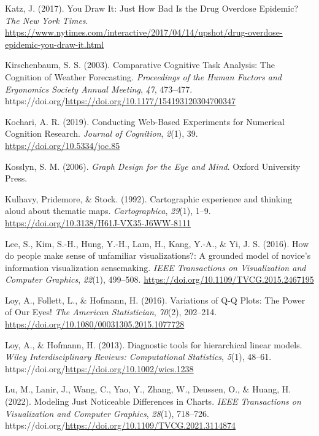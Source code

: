 \documentclass[
  10pt,
]{article}
\newlength{\cslhangindent}
\newenvironment{CSLReferences}[2] %
 {\begin{list}{}{%
  \setlength{\itemindent}{0pt}
  \setlength{\leftmargin}{0pt}
  \setlength{\parsep}{0pt}
  \ifodd #1
   \setlength{\leftmargin}{\cslhangindent}
   \setlength{\itemindent}{-1\cslhangindent}
  \fi
  \setlength{\itemsep}{#2\baselineskip}}}
 {\end{list}}
\begin{document}
\begin{CSLReferences}{1}{0}
Katz, J. (2017). You {Draw} {It}: {Just} {How} {Bad} {Is} the {Drug}
{Overdose} {Epidemic}? \emph{The New York Times}.
\url{https://www.nytimes.com/interactive/2017/04/14/upshot/drug-overdose-epidemic-you-draw-it.html}

Kirschenbaum, S. S. (2003). Comparative {Cognitive} {Task} {Analysis}:
{The} {Cognition} of {Weather} {Forecasting}. \emph{Proceedings of the
{Human} {Factors} and {Ergonomics} {Society} {Annual} {Meeting}},
\emph{47}, 473--477.
https://doi.org/\url{https://doi.org/10.1177/154193120304700347}

Kochari, A. R. (2019). Conducting {Web-Based Experiments} for {Numerical
Cognition Research}. \emph{Journal of Cognition}, \emph{2}(1), 39.
\url{https://doi.org/10.5334/joc.85}

Kosslyn, S. M. (2006). \emph{Graph {Design} for the {Eye} and {Mind}}.
Oxford University Press.

Kulhavy, Pridemore, \& Stock. (1992). Cartographic experience and
thinking aloud about thematic maps. \emph{Cartographica}, \emph{29}(1),
1--9. \url{https://doi.org/10.3138/H61J-VX35-J6WW-8111}

Lee, S., Kim, S.-H., Hung, Y.-H., Lam, H., Kang, Y.-A., \& Yi, J. S.
(2016). How do people make sense of unfamiliar visualizations?: A
grounded model of novice's information visualization sensemaking.
\emph{{IEEE} Transactions on Visualization and Computer Graphics},
\emph{22}(1), 499--508. \url{https://doi.org/10.1109/TVCG.2015.2467195}

Loy, A., Follett, L., \& Hofmann, H. (2016). Variations of {Q-Q Plots}:
{The Power} of {Our Eyes}! \emph{The American Statistician},
\emph{70}(2), 202--214.
\url{https://doi.org/10.1080/00031305.2015.1077728}

Loy, A., \& Hofmann, H. (2013). Diagnostic tools for hierarchical linear
models. \emph{Wiley Interdisciplinary Reviews: Computational
Statistics}, \emph{5}(1), 48--61.
https://doi.org/\url{https://doi.org/10.1002/wics.1238}

Lu, M., Lanir, J., Wang, C., Yao, Y., Zhang, W., Deussen, O., \& Huang,
H. (2022). Modeling {Just} {Noticeable} {Differences} in {Charts}.
\emph{IEEE Transactions on Visualization and Computer Graphics},
\emph{28}(1), 718--726.
https://doi.org/\url{https://doi.org/10.1109/TVCG.2021.3114874}


\end{CSLReferences}
\end{document}
